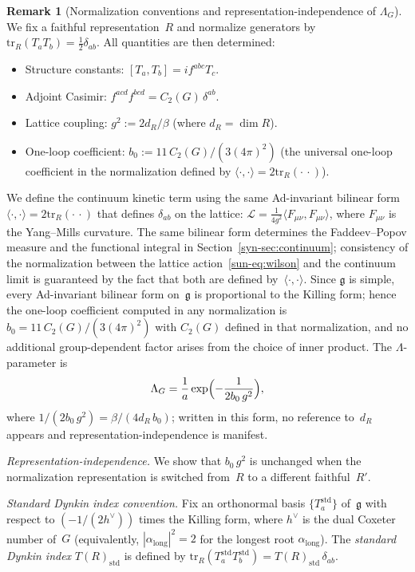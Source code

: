 \documentclass[11pt]{article}
\theoremstyle{definition}
\newtheorem{remark}[theorem]{Remark}
\newcommand{\tr}{\mathrm{tr}}
\newcommand{\fg}{\mathfrak{g}}
\begin{document}
\begin{remark}[Normalization conventions and
representation-independence of $\Lambda_G$]
\label{sun-rem:norm-match}
We fix a faithful representation~$R$ and normalize
generators by $\tr_R(T_a T_b)=\frac{1}{2}\delta_{ab}$.
All quantities are then determined:
\begin{itemize}[nosep]
\item Structure constants:
$[T_a,T_b]=if^{abc}T_c$.
\item Adjoint Casimir:
$f^{acd}f^{bcd}=C_2(G)\,\delta^{ab}$.
\item Lattice coupling:
$g^2:=2d_R/\beta$ (where $d_R=\dim R$).
\item One-loop coefficient:
$b_0:=11\,C_2(G)/(3(4\pi)^2)$
(the universal one-loop coefficient in the
normalization defined by
$\langle\cdot,\cdot\rangle=2\tr_R(\cdot\,\cdot)$).
\end{itemize}
We define the continuum kinetic term using the same
Ad-invariant bilinear form
$\langle\cdot,\cdot\rangle=2\tr_R(\cdot\,\cdot)$
that defines $\delta_{ab}$ on the lattice:
$\mathcal{L}=\frac{1}{4g^2}\langle F_{\mu\nu},
F_{\mu\nu}\rangle$, where $F_{\mu\nu}$ is the
Yang--Mills curvature.
The same bilinear form determines the Faddeev--Popov
measure and the functional integral
in Section~\ref{syn-sec:continuum}; consistency of the
normalization between the lattice action~\eqref{sun-eq:wilson}
and the continuum limit is guaranteed by the fact that
both are defined by~$\langle\cdot,\cdot\rangle$.
Since $\fg$ is simple, every Ad-invariant bilinear form
on~$\fg$ is proportional to the Killing form; hence the
one-loop coefficient computed in any normalization is
$b_0=11\,C_2(G)/(3(4\pi)^2)$ with $C_2(G)$ defined in
that normalization, and no additional group-dependent
factor arises from the choice of inner product.
The $\Lambda$-parameter is
\begin{equation}\label{sun-eq:lambda-def}
\Lambda_G=\frac{1}{a}\exp\Bigl(-\frac{1}{2b_0\,g^2}\Bigr),
\end{equation}
where $1/(2b_0\,g^2)=\beta/(4d_R\,b_0)$;
written in this form, no reference to~$d_R$ appears
and representation-independence is manifest.

\emph{Representation-independence.}
We show that $b_0\,g^2$ is unchanged when the
normalization representation is switched from~$R$
to a different faithful~$R'$.

\emph{Standard Dynkin index convention.}
Fix an orthonormal basis $\{T_a^{\mathrm{std}}\}$ of~$\fg$
with respect to $(-1/(2h^\vee))$ times the Killing form,
where $h^\vee$ is the dual Coxeter number of~$G$
(equivalently, $|\alpha_{\mathrm{long}}|^2=2$
for the longest root $\alpha_{\mathrm{long}}$).
The \emph{standard Dynkin index} $T(R)_{\mathrm{std}}$
is defined by
$\tr_R(T_a^{\mathrm{std}}T_b^{\mathrm{std}})
=T(R)_{\mathrm{std}}\,\delta_{ab}$.


\end{remark}
\end{document}
